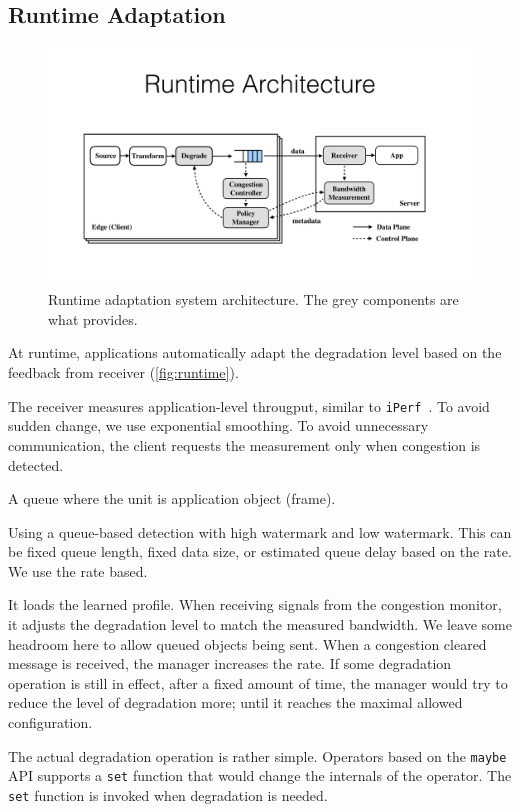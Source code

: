 \subsection{Runtime Adaptation}
\label{sec:adaptation}

\begin{figure}
  \centering
  \includegraphics[width=\linewidth]{figures/runtime.pdf}
  \caption{Runtime adaptation system architecture. The grey components are what
    \sysname{} provides.}
  \label{fig:runtime}
\end{figure}

At runtime, applications automatically adapt the degradation level based on the
feedback from receiver (\autoref{fig:runtime}).

 The receiver measures application-level througput,
similar to \texttt{iPerf}~\cite{iperf}. To avoid sudden change, we use
exponential smoothing. To avoid unnecessary communication, the client requests
the measurement only when congestion is detected.

 A queue where the unit is application object (frame).

 Using a queue-based detection with high watermark and
low watermark. This can be fixed queue length, fixed data size, or estimated
queue delay based on the rate. We use the rate based.

 It loads the learned profile. When receiving signals
from the congestion monitor, it adjusts the degradation level to match the
measured bandwidth. We leave some headroom here to allow queued objects being
sent. When a congestion cleared message is received, the manager increases the
rate. If some degradation operation is still in effect, after a fixed amount of
time, the manager would try to reduce the level of degradation more; until it
reaches the maximal allowed configuration.

 The actual degradation operation is rather simple. Operators
based on the \texttt{maybe} API supports a \texttt{set} function that would
change the internals of the operator. The \texttt{set} function is invoked when
degradation is needed.


